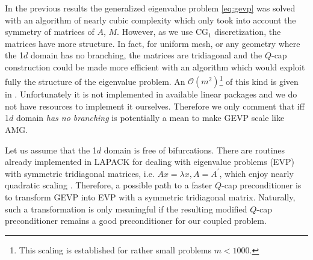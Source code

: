 \documentclass[10pt, a4paper]{article}
\newcommand{\dual}[1]{\ensuremath{{#1}^{\prime}}}
\begin{document}
In the previous results the generalized eigenvalue problem \eqref{eq:gevp} was 
solved with an algorithm of nearly cubic complexity which only took into account 
the symmetry of matrices of $A$, $M$. However, as we use CG$_1$ discretization, the matrices
have more structure. In fact, for uniform mesh, or any geometry where
the 1$d$ domain has no branching, the matrices are tridiagonal and the $Q$-cap 
construction could be made more efficient with an algorithm which would exploit 
fully the structure of the eigenvalue problem. An $\mathcal{O}(m^2)$\footnote{This 
scaling is established for rather small problems $m<1000$.} of this kind is given 
in \cite{gevp_s3d}. Unfortunately it is not implemented in available linear packages 
and we do not have resources to implement it ourselves. Therefore we only comment 
that iff 1$d$ domain \textit{has no branching} \cite{gevp_s3d} is potentially a mean 
to make GEVP scale like AMG.

Let us assume that the 1$d$ domain is free of bifurcations. There are routines already 
implemented in LAPACK for dealing with eigenvalue problems (EVP) with symmetric 
tridiagonal matrices, i.e. $Ax=\lambda x, A=\dual{A}$, which enjoy nearly quadratic 
scaling \cite{demmel}. Therefore, a possible path to a faster $Q$-cap preconditioner 
is to transform GEVP into EVP with a symmetric tridiagonal matrix. Naturally, such a 
transformation is only meaningful if the resulting modified $Q$-cap preconditioner 
remains a good preconditioner for our coupled problem.
\end{document}
